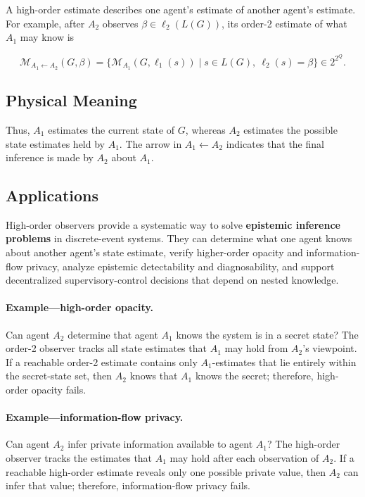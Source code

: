 \documentclass[11pt]{article}
\begin{document}
A high-order estimate describes one agent's estimate of another agent's estimate. For example, after $A_2$ observes $\beta\in\ell_2(L(G))$, its order-2 estimate of what $A_1$ may know is

\[
\mathcal M_{A_1\leftarrow A_2}(G,\beta)
=
\{\mathcal M_{A_1}(G,\ell_1(s))
\mid
s\in L(G),\ \ell_2(s)=\beta\}
\in 2^{2^Q}.
\]

\subsection{Physical Meaning}

Thus, $A_1$ estimates the current state of $G$, whereas $A_2$ estimates the possible state estimates held by $A_1$. The arrow in $A_1\leftarrow A_2$ indicates that the final inference is made by $A_2$ about $A_1$.

\subsection{Applications}

High-order observers provide a systematic way to solve \textbf{epistemic inference problems} in discrete-event systems. They can determine what one agent knows about another agent's state estimate, verify higher-order opacity and information-flow privacy, analyze epistemic detectability and diagnosability, and support decentralized supervisory-control decisions that depend on nested knowledge.

\paragraph{Example---high-order opacity.}
Can agent $A_2$ determine that agent $A_1$ knows the system is in a secret state? The order-2 observer tracks all state estimates that $A_1$ may hold from $A_2$'s viewpoint. If a reachable order-2 estimate contains only $A_1$-estimates that lie entirely within the secret-state set, then $A_2$ knows that $A_1$ knows the secret; therefore, high-order opacity fails.

\paragraph{Example---information-flow privacy.}
Can agent $A_2$ infer private information available to agent $A_1$? The high-order observer tracks the estimates that $A_1$ may hold after each observation of $A_2$. If a reachable high-order estimate reveals only one possible private value, then $A_2$ can infer that value; therefore, information-flow privacy fails.
\end{document}
